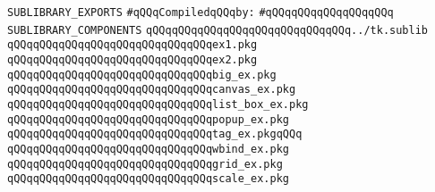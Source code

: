 \label{src/lib/tk/src/tests+examples/sources.sublib}
\verb|SUBLIBRARY_EXPORTS|\newline
\newline
\verb|#qQQqCompiledqQQqby:|\newline
\verb|#qQQqqQQqqQQqqQQqqQQq|\newline
\newline
\verb|SUBLIBRARY_COMPONENTS|\newline
\newline
\verb|qQQqqQQqqQQqqQQqqQQqqQQqqQQqqQQq../tk.sublib|\newline
\newline
\verb|qQQqqQQqqQQqqQQqqQQqqQQqqQQqqQQqex1.pkg|\newline
\verb|qQQqqQQqqQQqqQQqqQQqqQQqqQQqqQQqex2.pkg|\newline
\newline
\verb|qQQqqQQqqQQqqQQqqQQqqQQqqQQqqQQqbig_ex.pkg|\newline
\verb|qQQqqQQqqQQqqQQqqQQqqQQqqQQqqQQqcanvas_ex.pkg|\newline
\verb|qQQqqQQqqQQqqQQqqQQqqQQqqQQqqQQqlist_box_ex.pkg|\newline
\verb|qQQqqQQqqQQqqQQqqQQqqQQqqQQqqQQqpopup_ex.pkg|\newline
\verb|qQQqqQQqqQQqqQQqqQQqqQQqqQQqqQQqtag_ex.pkgqQQq|\newline
\verb|qQQqqQQqqQQqqQQqqQQqqQQqqQQqqQQqwbind_ex.pkg|\newline
\verb|qQQqqQQqqQQqqQQqqQQqqQQqqQQqqQQqgrid_ex.pkg|\newline
\verb|qQQqqQQqqQQqqQQqqQQqqQQqqQQqqQQqscale_ex.pkg|\newline

